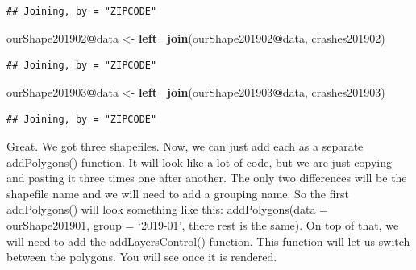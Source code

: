 \documentclass[]{book}
\newenvironment{Shaded}{\begin{snugshade}}{\end{snugshade}}
\newcommand{\KeywordTok}[1]{\textcolor[rgb]{0.13,0.29,0.53}{\textbf{#1}}}
\newcommand{\NormalTok}[1]{#1}
\newcommand{\OperatorTok}[1]{\textcolor[rgb]{0.81,0.36,0.00}{\textbf{#1}}}
\newcommand{\StringTok}[1]{\textcolor[rgb]{0.31,0.60,0.02}{#1}}
\begin{document}
\begin{verbatim}
## Joining, by = "ZIPCODE"
\end{verbatim}

\begin{Shaded}
\begin{Highlighting}[]
\NormalTok{ourShape201902}\OperatorTok{@}\NormalTok{data <-}\StringTok{ }\KeywordTok{left_join}\NormalTok{(ourShape201902}\OperatorTok{@}\NormalTok{data, crashes201902)}
\end{Highlighting}
\end{Shaded}

\begin{verbatim}
## Joining, by = "ZIPCODE"
\end{verbatim}

\begin{Shaded}
\begin{Highlighting}[]
\NormalTok{ourShape201903}\OperatorTok{@}\NormalTok{data <-}\StringTok{ }\KeywordTok{left_join}\NormalTok{(ourShape201903}\OperatorTok{@}\NormalTok{data, crashes201903)}
\end{Highlighting}
\end{Shaded}

\begin{verbatim}
## Joining, by = "ZIPCODE"
\end{verbatim}

Great. We got three shapefiles. Now, we can just add each as a separate addPolygons() function. It will look like a lot of code, but we are just copying and pasting it three times one after another. The only two differences will be the shapefile name and we will need to add a grouping name. So the first addPolygons() will look something like this: addPolygons(data = ourShape201901, group = `2019-01', there rest is the same). On top of that, we will need to add the addLayersControl() function. This function will let us switch between the polygons. You will see once it is rendered.
\end{document}
